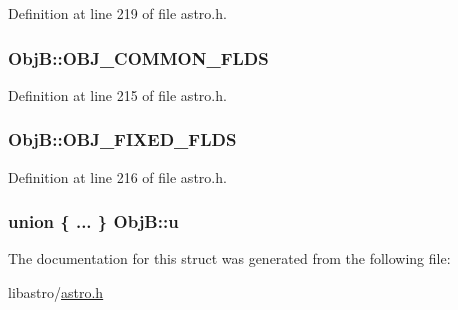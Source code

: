Definition at line 219 of file astro.\-h.

\hypertarget{struct_obj_b_a1a35d318e044b682941c0030c856dbed}{
\subsubsection[{O\-B\-J\-\_\-\-C\-O\-M\-M\-O\-N\-\_\-\-F\-L\-D\-S}]{\setlength{\rightskip}{0pt plus 5cm}Obj\-B\-::\-O\-B\-J\-\_\-\-C\-O\-M\-M\-O\-N\-\_\-\-F\-L\-D\-S}}\label{struct_obj_b_a1a35d318e044b682941c0030c856dbed}


Definition at line 215 of file astro.\-h.

\hypertarget{struct_obj_b_aa756c8c241e67339e273e8d3a5215e1c}{
\subsubsection[{O\-B\-J\-\_\-\-F\-I\-X\-E\-D\-\_\-\-F\-L\-D\-S}]{\setlength{\rightskip}{0pt plus 5cm}Obj\-B\-::\-O\-B\-J\-\_\-\-F\-I\-X\-E\-D\-\_\-\-F\-L\-D\-S}}\label{struct_obj_b_aa756c8c241e67339e273e8d3a5215e1c}


Definition at line 216 of file astro.\-h.

\hypertarget{struct_obj_b_a5a002e40b447bb980bb3375c58ab7d48}{
\subsubsection[{u}]{\setlength{\rightskip}{0pt plus 5cm}union \{ ... \}   Obj\-B\-::u}}\label{struct_obj_b_a5a002e40b447bb980bb3375c58ab7d48}


The documentation for this struct was generated from the following file\-:\begin{DoxyCompactItemize}
\item 
libastro/\hyperlink{astro_8h}{astro.\-h}\end{DoxyCompactItemize}
